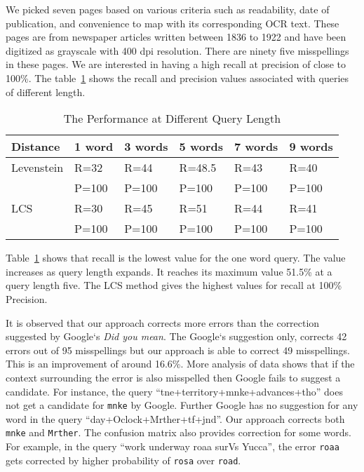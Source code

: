 \documentclass{article}
\begin{document}
We picked seven pages based on various criteria such as readability,
date of publication, and convenience to map with its corresponding OCR
text.  These pages are from newspaper articles written between 1836 to
1922 and have been digitized as grayscale with 400 dpi
resolution. There are ninety five misspellings in these pages. We are
interested in having a high recall at precision of close to 100\%. The
table~\ref{tab:performance} shows the recall and precision values
associated with queries of different length.

\begin{table}
\begin{center}
\begin{tabular}{|l|l|l|l|l|l|}\label{tab:performance}
Distance & 1 word&3 words &5 words &7 words& 9 words\\
\hline
Levenstein& R=32&R=44&R=48.5&R=43&R=40\\
          & P=100&P=100&P=100&P=100&P=100\\
\hline
LCS&R=30&R=45&R=51&R=44&R=41\\
   & P=100&P=100&P=100&P=100&P=100\\
\hline
\end{tabular}
\caption{The Performance at Different Query Length}
\end{center}
\end{table}

Table~\ref{tab:performance} shows that recall is the lowest value for
the one word query.  The value increases as query length expands.
It reaches its maximum value 51.5\% at a query length
five. The LCS method gives the highest values for recall at 100\%
Precision. 

It is observed that our approach corrects more errors than the
correction suggested by Google`s {\em Did you mean}. The Google`s
suggestion only, corrects 42 errors out of 95 misspellings but our
approach is able to correct 49 misspellings. This is an improvement of
around 16.6\%. More analysis of data shows that if the context
surrounding the error is also misspelled then Google fails to suggest
a candidate. For instance, the query “tne+territory+mnke+advances+tho”
does not get a candidate for {\tt mnke} by Google. Further Google has
no suggestion for any word in the query
“day+Oclock+Mrther+tf+jnd”. Our approach corrects both {\tt mnke} and
{\tt Mrther}. The confusion matrix also provides correction for some
words. For example, in the query “work underway roaa surVs Yucca”,
the error {\tt roaa} gets corrected by higher probability of {\tt rosa}
over {\tt road}.
\end{document}
